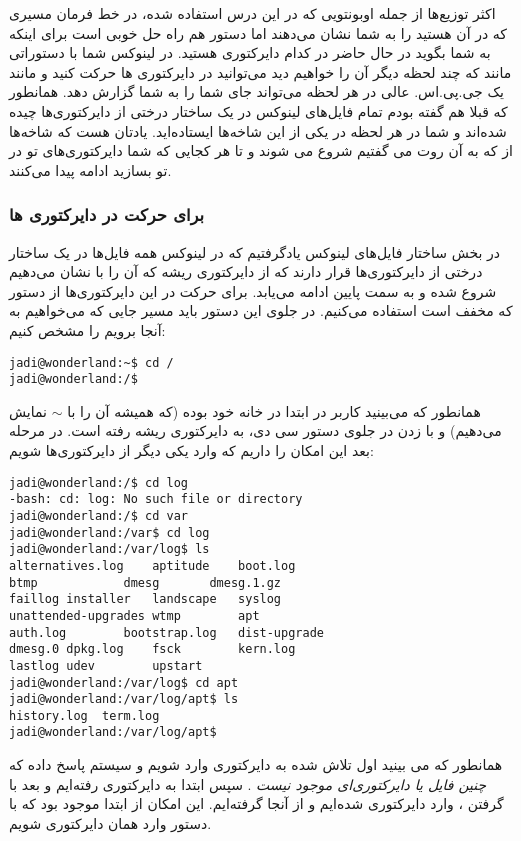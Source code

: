 اکثر توزیع‌ها از جمله اوبونتویی که در این درس استفاده شده، در خط فرمان مسیری که در آن هستید را به شما نشان می‌دهند اما دستور 
 هم راه حل خوبی است برای اینکه به شما بگوید در حال حاضر در کدام دایرکتوری هستید. در لینوکس شما با دستوراتی مانند  که چند لحظه دیگر آن را خواهیم دید می‌توانید در دایرکتوری ها حرکت کنید و 
 مانند یک جی.پی.اس. عالی در هر لحظه می‌تواند جای شما را به شما گزارش دهد. همانطور که قبلا هم گفته بودم تمام فایل‌های لینوکس در یک ساختار درختی از دایرکتوری‌ها چیده شده‌اند و شما در هر لحظه در یکی از این شاخه‌ها ایستاده‌اید. یادتان هست که شاخه‌ها از \lr{/} که به آن روت می گفتیم شروع می شوند و تا هر کجایی که شما دایرکتوری‌های تو در تو بسازید ادامه پیدا می‌کنند.
\subsubsection*{ برای حرکت در دایرکتوری ها}
در بخش ساختار فایل‌های لینوکس  یادگرفتیم که در لینوکس همه فایل‌ها در یک ساختار درختی از دایرکتوری‌ها قرار دارند که از دایرکتوری ریشه که آن را با \lr{/} نشان می‌دهیم شروع شده و به سمت پایین ادامه می‌یابد. برای حرکت در این دایرکتوری‌ها از دستور  که مخفف  است استفاده می‌کنیم. در جلوی این دستور باید مسیر جایی که می‌خواهیم به آنجا برویم را مشخص کنیم:
\begin{frameng}
\begin{lstlisting}
jadi@wonderland:~$ cd /
jadi@wonderland:/$ 
\end{lstlisting}
\end{frameng}
همانطور که می‌بینید کاربر در ابتدا در خانه خود بوده (که همیشه آن را با $\sim$ نمایش می‌دهیم) و با زدن \lr{/} در جلوی دستور سی دی، به دایرکتوری ریشه رفته است. در مرحله بعد این امکان را داریم که وارد یکی دیگر از دایرکتوری‌ها شویم:
\begin{frameng}
\small
\begin{lstlisting}
jadi@wonderland:/$ cd log
-bash: cd: log: No such file or directory
jadi@wonderland:/$ cd var
jadi@wonderland:/var$ cd log
jadi@wonderland:/var/log$ ls
alternatives.log	aptitude	boot.log
btmp			dmesg		dmesg.1.gz
faillog	installer	landscape	syslog
unattended-upgrades	wtmp		apt
auth.log		bootstrap.log	dist-upgrade
dmesg.0	dpkg.log	fsck		kern.log
lastlog	udev		upstart
jadi@wonderland:/var/log$ cd apt
jadi@wonderland:/var/log/apt$ ls
history.log  term.log
jadi@wonderland:/var/log/apt$ 
\end{lstlisting}
\end{frameng}

همانطور که می بینید اول تلاش شده به دایرکتوری 
 وارد شویم و سیستم پاسخ داده که
\emph{چنین فایل یا دایرکتوری‌ای موجود نیست}
. سپس ابتدا به دایرکتوری 
 رفته‌ایم و بعد با گرفتن ، وارد دایرکتوری 
 شده‌ایم و از آنجا  گرفته‌ایم. این امکان از ابتدا موجود بود که با دستور
وارد همان دایرکتوری شویم.

